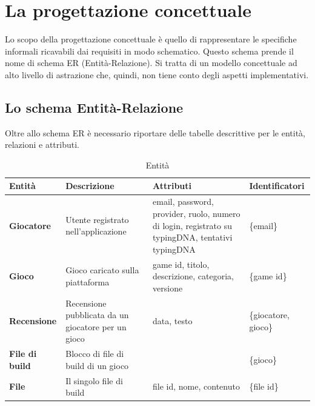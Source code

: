\section{La progettazione concettuale}
Lo scopo della progettazione concettuale è quello di rappresentare le specifiche informali ricavabili dai requisiti in modo schematico. Questo schema prende il nome di schema ER (Entità-Relazione). Si tratta di un modello concettuale ad alto livello di astrazione che, quindi, non tiene conto degli aspetti implementativi.

\subsection{Lo schema Entità-Relazione}
Oltre allo schema ER è necessario riportare delle tabelle descrittive per le entità, relazioni e attributi.


\begin{table}[hbt!]
    \centering
    \begin{tabular}{ m{} m{} m{} m{} }
        \hline
        \textbf{Entità} & \textbf{Descrizione} & \textbf{Attributi} & \textbf{Identificatori} \\
        \hline
        \textbf{Giocatore} & Utente registrato nell'applicazione & email, password, provider, ruolo, numero di login, registrato su typingDNA, tentativi typingDNA & \{email\} \\
        \hline
        \textbf{Gioco} & Gioco caricato sulla piattaforma & game id, titolo, descrizione, categoria, versione & \{game id\} \\
        \hline
        \textbf{Recensione} & Recensione pubblicata da un giocatore per un gioco & data, testo & \{giocatore, gioco\} \\
        \hline
        \textbf{File di build} & Blocco di file di build di un gioco &  & \{gioco\} \\
        \hline
        \textbf{File} & Il singolo file di build & file id, nome, contenuto & \{file id\} \\
    \end{tabular}
    \caption{Entità}
\end{table}

